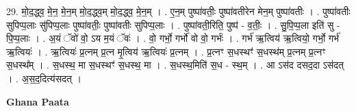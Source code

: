 \documentclass[17pt]{extarticle}
\begin{document}
29. मो॒द॒द्ध्व॒ मे॒न॒ मे॒न॒म् मो॒द॒द्ध्व॒म् मो॒द॒द्ध्व॒ मे॒न॒म् । . ए॒न॒म् पुष्पा॑वतीः॒ पुष्पा॑वतीरेन मेन॒म् पुष्पा॑वतीः । . पुष्पा॑वतीः सुपिप्प॒लाः सु॑पिप्प॒लाः पुष्पा॑वतीः॒ पुष्पा॑वतीः सुपिप्प॒लाः । . पुष्पा॑वती॒रिति॒ पुष्प॑ - व॒तीः॒ । . सु॒पि॒प्प॒ला इति॑ सु - पि॒प्प॒लाः । . अ॒यं ॅवो॑ वो॒ ऽय म॒यं ॅवः॑ । . वो॒ गर्भो॒ गर्भो॑ वो वो॒ गर्भः॑ । . गर्भ॑ ऋ॒त्विय॑ ऋ॒त्वियो॒ गर्भो॒ गर्भ॑ ऋ॒त्वियः॑ । . ऋ॒त्वियः॑ प्र॒त्नम् प्र॒त्न मृ॒त्विय॑ ऋ॒त्वियः॑ प्र॒त्नम् । . प्र॒त्नꣳ स॒धस्थꣳ॑ स॒धस्थ॑म् प्र॒त्नम् प्र॒त्नꣳ स॒धस्थ᳚म् । . स॒धस्थ॒ मा स॒धस्थꣳ॑ स॒धस्थ॒ मा । . स॒धस्थ॒मिति॑ स॒ध - स्थ॒म् । . आ ऽस॑द दसद॒दा ऽस॑दत् । . अ॒स॒द॒दित्य॑सदत् । \newline

\textbf{Ghana Paata } \newline
\end{document}
